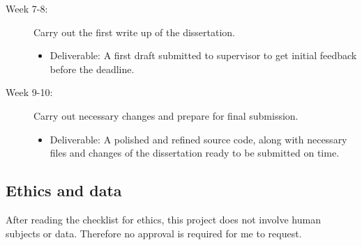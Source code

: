 \documentclass[11pt]{article}
\begin{document}
    \begin{description}
  \item[Week 7-8:] Carry out the first write up of the dissertation.
    \begin{itemize}
      \item Deliverable: A first draft submitted to supervisor to get initial feedback before the deadline.
    \end{itemize}
\end{description}
    \begin{description}
  \item[Week 9-10:] Carry out necessary changes and prepare for final submission.
    \begin{itemize}
      \item Deliverable: A polished and refined source code, along with necessary files and changes of the dissertation ready to be submitted on time.
    \end{itemize}
\end{description}
\subsection{Ethics and data}\label{ethics}

After reading the checklist for ethics, this project does not involve human subjects or data.
Therefore no approval is required for me to request.
\end{document}
